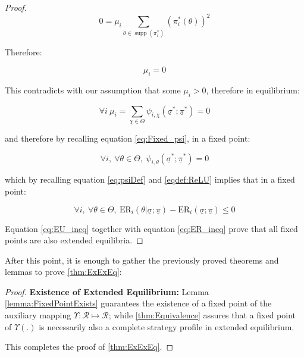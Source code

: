 \documentclass{article}
\theoremstyle{definition}
\DeclareMathOperator\supp{supp}
\begin{document}
\begin{proof}
\begin{equation}
    0
    =
    \mu_i
    \sum_{\theta \in \supp(\pi_i^*)} \left ( \pi_i^*(\theta) \right )^2
\end{equation}

Therefore:

\begin{equation}
    \mu_i = 0
\end{equation}

This contradicts with our assumption that some $\mu_i > 0$, therefore in equilibrium:

\begin{equation}
    \forall i \ \mu_i = \sum_{\chi \in \Theta} \psi_{i,\chi}(\underline{\sigma}^*;\underline{\pi}^*) = 0
\end{equation}

and therefore by recalling equation \eqref{eq:Fixed_psi}, in a fixed point:

\begin{equation}
    \forall i, \ \forall \theta \in \Theta, \ 
    \psi_{i,\theta}(\underline{\sigma}^*;\underline{\pi}^*) = 0
\end{equation}

which by recalling equation \eqref{eq:psiDef}  and \eqref{eqdef:ReLU} implies that in a fixed point:

\begin{equation}
\label{eq:ER_ineq}
\boxed{
    \forall i, \ \forall \theta \in \Theta, \ 
    \mathrm{ER}_i(\theta | \underline{\sigma};\underline{\pi})
    -
    \mathrm{ER}_i(\underline{\sigma};\underline{\pi})
    \le 0
    }
\end{equation}

Equation \eqref{eq:EU_ineq} together with equation \eqref{eq:ER_ineq} prove that all fixed points are also extended equilibria.

\end{proof}

After this point, it is enough to gather the previously proved theorems and lemmas to prove \autoref{thm:ExExEq}:

\begin{proof}
{\bf Existence of Extended Equilibrium:}
Lemma \autoref{lemma:FixedPointExists} guarantees the existence of a fixed point of the auxiliary mapping $\Upsilon : \mathcal{R} \mapsto \mathcal{R}$;
while \autoref{thm:Equivalence} assures that a fixed point of $\Upsilon(.)$ is necessarily also a complete strategy profile in extended equilibrium.

This completes the proof of \autoref{thm:ExExEq}.
    
\end{proof}
\end{document}

